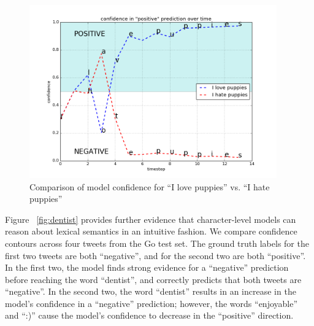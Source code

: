 \documentclass{article} %
\begin{document}
\begin{figure}[h!]
\label{fig:puppies}
\begin{center}
\includegraphics[width=0.95\textwidth]{figs/puppies}
\end{center}
\caption{Comparison of model confidence for ``I love puppies'' vs. ``I hate puppies''}
\end{figure}

Figure ~\ref{fig:dentist} provides further evidence that character-level models can reason about lexical semantics in an intuitive fashion. We compare confidence contours across four tweets from the Go test set. The ground truth labels for the first two tweets are both ``negative'', and for the second two are both ``positive''. In the first two, the model finds strong evidence for a ``negative'' prediction before reaching the word ``dentist'', and correctly predicts that both tweets are ``negative''. In the second two, the word ``dentist'' results in an increase in the model's confidence in a ``negative'' prediction; however, the words ``enjoyable'' and ``:)'' cause the model's confidence to decrease in the ``positive'' direction. 
\end{document}
